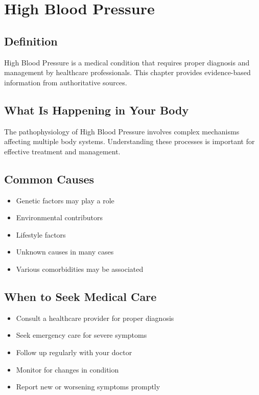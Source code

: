 
\chapter{High Blood Pressure}

\section*{Definition}
High Blood Pressure is a medical condition that requires proper diagnosis and management by healthcare professionals. This chapter provides evidence-based information from authoritative sources.

\section*{What Is Happening in Your Body}
The pathophysiology of High Blood Pressure involves complex mechanisms affecting multiple body systems. Understanding these processes is important for effective treatment and management.

\section*{Common Causes}
\begin{itemize}
  \item Genetic factors may play a role
  \item Environmental contributors
  \item Lifestyle factors
  \item Unknown causes in many cases
  \item Various comorbidities may be associated
\end{itemize}

\section*{When to Seek Medical Care}
\begin{itemize}
  \item Consult a healthcare provider for proper diagnosis
  \item Seek emergency care for severe symptoms
  \item Follow up regularly with your doctor
  \item Monitor for changes in condition
  \item Report new or worsening symptoms promptly
\end{itemize}


